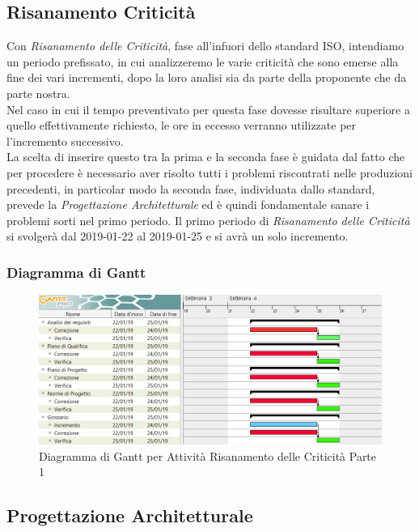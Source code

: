 \subsection{Risanamento Criticità}
\label{RC1}

Con \textit{Risanamento delle Criticità}, fase all'infuori dello standard ISO, intendiamo un periodo prefissato, in cui  analizzeremo le varie criticità che sono emerse alla fine dei vari incrementi, dopo la loro analisi sia da parte della proponente che da parte nostra. \\
Nel caso in cui il tempo preventivato per questa fase dovesse risultare superiore a quello effettivamente richiesto, le ore in eccesso verranno utilizzate per l'incremento successivo.\\
La scelta di inserire questo tra la prima e la seconda fase è guidata dal fatto che per procedere è necessario aver risolto tutti i problemi riscontrati nelle produzioni precedenti, in particolar modo la seconda fase, individuata dallo standard, prevede la \textit{Progettazione Architetturale} ed è quindi fondamentale sanare i problemi sorti nel primo periodo. 
Il primo periodo di \textit{Risanamento delle Criticità} si svolgerà dal 2019-01-22 al 2019-01-25  e si avrà un solo incremento.

\subsubsection{Diagramma di Gantt}

\begin{figure}[h]
	\centering
  		\includegraphics[width=1.0\linewidth]{./images/RisanamentoCriticita1.png}
  		\caption{Diagramma di Gantt per Attività Risanamento delle Criticità Parte 1}
  		\label{fig:Gantt Risananmento Criticità 1}
\end{figure}

\newpage
\subsection{Progettazione Architetturale}
\label{PA}

